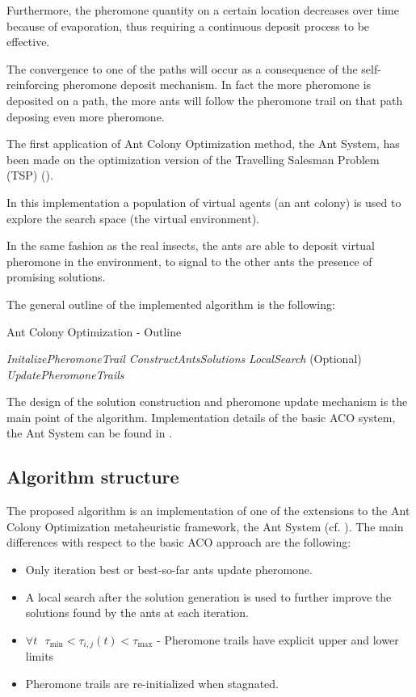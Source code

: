\begin{homeworkProblem}
Furthermore, the pheromone quantity on a certain location decreases over time because of evaporation, thus requiring a continuous deposit process to be effective.

The convergence to one of the paths will occur as a consequence of the self-reinforcing pheromone deposit mechanism.
In fact the more pheromone is deposited on a path, the more ants will follow the pheromone trail on that path deposing even more pheromone.

The first application of Ant Colony Optimization method, the Ant System, has been made on the optimization version of the Travelling Salesman Problem (TSP) (\cite{dorigo1996ant}).

In this implementation a population of virtual agents (an ant colony) is used to explore the search space (the virtual environment).

In the same fashion as the real insects, the ants are able to deposit virtual pheromone in the environment, to signal to the other ants the presence of promising solutions.

The general outline of the implemented algorithm is the following: 

\begin{algorithm}[!h]
  \caption{Ant Colony Optimization - Outline}\label{aco}
  \begin{algorithmic}[1]
    \State \emph{InitalizePheromoneTrail} 
        \State \emph{ConstructAntsSolutions}
        \State \emph{LocalSearch} (Optional)
        \State \emph{UpdatePheromoneTrails}
    \EndWhile
\end{algorithmic}
\end{algorithm}

The design of the solution construction and pheromone update mechanism is the main point of the algorithm.
Implementation details of the basic ACO system, the Ant System can be found in \cite{dorigo2006artificial}.

\subsection{Algorithm structure} \label{sec:algstrucACO}
The proposed algorithm is an implementation of one of the extensions to the Ant Colony Optimization metaheuristic framework, the \maxmin Ant System (cf. \cite{stutzle2000max}).
The main differences with respect to the basic ACO approach are the following:
\begin{itemize}
  \item Only iteration best or best-so-far ants update pheromone.
  \item A local search after the solution generation is used to further improve the solutions found by the ants at each iteration.
  \item $\forall t \text{ } \tau_{\min} < \tau_{i,j}(t) < \tau_{\max}  $ - Pheromone trails have explicit upper and lower limits
  \item Pheromone trails are re-initialized when stagnated.
\end{itemize}


\end{homeworkProblem}
